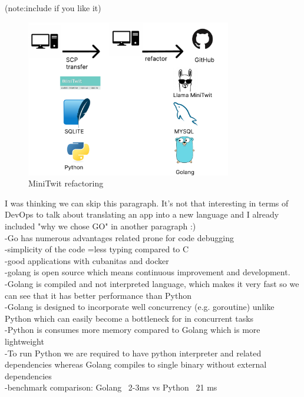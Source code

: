 \documentclass{article}
\begin{document}
(note:include if you like it)
\begin{figure}[ht]
    \centering
    \includegraphics[width=0.8\textwidth]{./pdfs/refactoring.pdf} 
    \caption{MiniTwit refactoring}
    \label{fig:MiniTwit refactoring}
\end{figure}
I was thinking we can skip this paragraph. It's not that interesting in terms of DevOps to talk about translating an app into a new language and I already included "why we chose GO" in another paragraph :)
\\ -Go has numerous advantages related prone for code debugging
\\ -simplicity of the code =less typing compared to C
\\-good applications with cubanitas and docker
\\ -golang is open source which means continuous improvement and development.
\\-Golang is compiled and not interpreted language, which makes it very fast so we can see that it has better performance than Python
\\-Golang is designed to incorporate well concurrency (e.g. goroutine) unlike Python which can easily become a bottleneck for in concurrent tasks
\\-Python is consumes more memory compared to Golang which is more lightweight
\\-To run Python we are required to have python interpreter and related dependencies whereas Golang compiles to single binary without external
 dependencies
\\-benchmark comparison: Golang ~2-3ms vs Python ~21 ms
\end{document}
